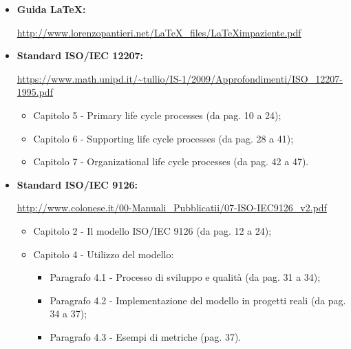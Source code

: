 \begin {itemize}
\begin{itemize}
        \begin{itemize}
            \item Paragrafo 25.1 - Version management (da pag. 735 a 740);
            \item Paragrafo 25.2 - System building (da pag. 740 a 745).
        \end{itemize}
\end{itemize}
\item \textbf{Guida \LaTeX:}
\begin{center}
    \url{http://www.lorenzopantieri.net/LaTeX_files/LaTeXimpaziente.pdf}
\end{center}
\item \textbf{Standard ISO/IEC 12207:}
\begin{center}
    \url{https://www.math.unipd.it/~tullio/IS-1/2009/Approfondimenti/ISO_12207-1995.pdf}
    \begin{itemize}
        \item Capitolo 5 - Primary life cycle processes (da pag. 10 a 24);
        \item Capitolo 6 - Supporting life cycle processes (da pag. 28 a 41);
        \item Capitolo 7 - Organizational life cycle processes (da pag. 42 a 47).
    \end{itemize}
\end{center}
\item \textbf{Standard ISO/IEC 9126:}
\begin{center}
    \url{http://www.colonese.it/00-Manuali_Pubblicatii/07-ISO-IEC9126_v2.pdf}
    \begin{itemize}
        \item Capitolo 2 - Il modello ISO/IEC 9126 (da pag. 12 a 24);
        \item Capitolo 4 - Utilizzo del modello:
            \begin{itemize}
                \item Paragrafo 4.1 - Processo di sviluppo e qualità (da pag. 31 a 34);
                \item Paragrafo 4.2 - Implementazione del modello in progetti reali (da pag. 34 a 37);
                \item Paragrafo 4.3 - Esempi di metriche (pag. 37).
            \end{itemize}
    \end{itemize}

\end{center}
\end{itemize}